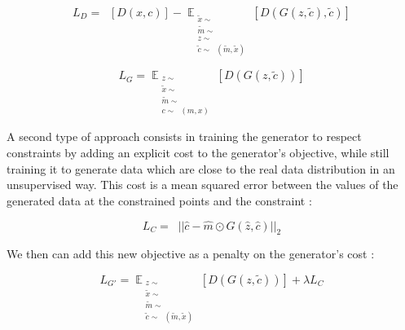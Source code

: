 \documentclass{article}
\begin{document}
	\begin{equation}
	\label{cgan}
	L_{D}  = \mathop{\mathbb{{E}}_{\substack{
				x \sim \mathop{\mathbb{{P}}_{r}} \\
				m \sim \mathop{\mathbb{{P}}_{m}}\\
				c \sim \mathop{\mathbb{{P}}_{c}}(m, x)
	}}} [D(x, c)] 
	- \mathop{\mathbb{{E}}}_{\substack{
			\tilde{x} \sim \mathop{\mathbb{{P}}_{r}} \\
			\tilde{m} \sim \mathop{\mathbb{{P}}_{m} }\\
			z \sim \mathop{\mathbb{{P}}_{z} }\\
			\tilde{c} \sim \mathop{\mathbb{{P}}_{c}}(\tilde{m}, \tilde{x})
	}} [D(G(z, \tilde{c}), \tilde{c})] 
	\end{equation}
	
	\begin{equation}
	L_{G}  = \mathop{\mathbb{{E}}}_{\substack{
			z \sim \mathop{\mathbb{{P}}_{z}} \\
			\tilde{x} \sim \mathop{\mathbb{{P}}_{r}} \\
			\tilde{m} \sim \mathop{\mathbb{{P}}_{m} }\\
			c \sim \mathop{\mathbb{{P}}_{c}}(m, x)
	}} [D(G(z, \tilde{c}))] 
	\end{equation}
	
	A second type of approach consists in training the generator to respect constraints by adding an explicit cost to the generator's objective, while still training it to generate data which are close to the real data distribution in an unsupervised way. This cost is a mean squared error between the values of the generated data at the constrained points and the constraint :
	
	\begin{equation}
	\label{lc}
	L_C = \mathop{\mathbb{{E}}_{\substack{
				\hat{x} \sim \mathop{\mathbb{{P}}_{r}} \\
				\hat{z} \sim \mathop{\mathbb{{P}}_{z}}\\
				\hat{m} \sim \mathop{\mathbb{{P}}_{z}} \\	
				\hat{c} \sim \mathop{\mathbb{{P}}_{c}}(\tilde{m}, \tilde{x})
	}}} || \hat{c} - \hat{m} \odot G(\hat{z}, \hat{c}) ||_2
	\end{equation}
	
	
	We then can add this new objective as a penalty on the generator's cost :
	
	
	\begin{equation}
	L_{G'} =  \mathop{\mathbb{{E}}}_{\substack{
			z \sim \mathop{\mathbb{{P}}_{z}} \\
			\tilde{x} \sim \mathop{\mathbb{{P}}_{r}} \\
			\tilde{m} \sim \mathop{\mathbb{{P}}_{m} }\\
			\tilde{c} \sim \mathop{\mathbb{{P}}_{c}}(\tilde{m}, \tilde{x})
	}} [D(G(z, \tilde{c}))]  + \lambda L_C
	\end{equation}
	
\end{document}
